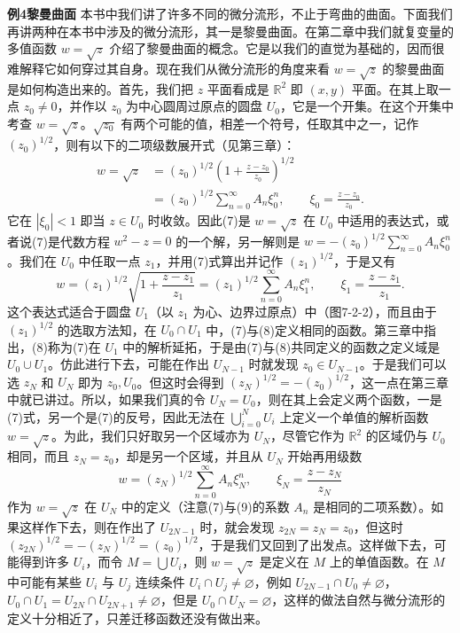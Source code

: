 \noindent\textbf{例4\quad 黎曼曲面}\quad
本书中我们讲了许多不同的微分流形，不止于弯曲的曲面。下面我们再讲两种在本书中涉及的微分流形，其一是黎曼曲面。在第二章中我们就复变量的多值函数 $w=\sqrt z$ 介绍了黎曼曲面的概念。它是以我们的直觉为基础的，因而很难解释它如何穿过其自身。现在我们从微分流形的角度来看 $w=\sqrt z$ 的黎曼曲面是如何构造出来的。首先，我们把 $z$ 平面看成是 $\mathbb R^2$ 即 $(x,y)$ 平面。在其上取一点 $z_0\ne0$，并作以 $z_0$ 为中心圆周过原点的圆盘 $U_0$，它是一个开集。在这个开集中考查 $w=\sqrt z$。$\sqrt{z_0}$ 有两个可能的值，相差一个符号，任取其中之一，记作 $(z_0)^{1/2}$，则有以下的二项级数展开式（见第三章）：
\begin{equation}
 \begin{aligned}
 w=\sqrt z
 &= (z_0)^{1/2}\left(1+\frac{z-z_0}{z_0}\right)^{1/2}\\
 &= (z_0)^{1/2}\sum_{n=0}^{\infty}A_n\xi_0^n,
 \qquad \xi_0=\frac{z-z_0}{z_0}.
 \end{aligned}
 \tag{7}
\end{equation}
它在 $|\xi_0|<1$ 即当 $z\in U_0$ 时收敛。因此(7)是 $w=\sqrt z$ 在 $U_0$ 中适用的表达式，或者说(7)是代数方程 $w^2-z=0$ 的一个解，另一解则是 $w=-(z_0)^{1/2}\sum_{n=0}^\infty A_n\xi_0^n$。我们在 $U_0$ 中任取一点 $z_1$，并用(7)式算出并记作 $(z_1)^{1/2}$，于是又有
\begin{equation}
 w=(z_1)^{1/2}\sqrt{1+\frac{z-z_1}{z_1}}
 =(z_1)^{1/2}\sum_{n=0}^{\infty}A_n\xi_1^n,
 \qquad \xi_1=\frac{z-z_1}{z_1}.
 \tag{8}
\end{equation}
这个表达式适合于圆盘 $U_1$（以 $z_1$ 为心、边界过原点）中（图7-2-2），而且由于 $(z_1)^{1/2}$ 的选取方法知，在 $U_0\cap U_1$ 中，(7)与(8)定义相同的函数。第三章中指出，(8)称为(7)在 $U_1$ 中的解析延拓，于是由(7)与(8)共同定义的函数之定义域是 $U_0\cup U_1$。仿此进行下去，可能在作出 $U_{N-1}$ 时就发现 $z_0\in U_{N-1}$。于是我们可以选 $z_N$ 和 $U_N$ 即为 $z_0,U_0$。但这时会得到 $(z_N)^{1/2}=-(z_0)^{1/2}$，这一点在第三章中就已讲过。所以，如果我们真的令 $U_N=U_0$，则在其上会定义两个函数，一是(7)式，另一个是(7)的反号，因此无法在 $\bigcup_{i=0}^{N}U_i$ 上定义一个单值的解析函数 $w=\sqrt z$。为此，我们只好取另一个区域亦为 $U_N$，尽管它作为 $\mathbb R^2$ 的区域仍与 $U_0$ 相同，而且 $z_N=z_0$，却是另一个区域，并且从 $U_N$ 开始再用级数
\begin{equation}
 w=(z_N)^{1/2}\sum_{n=0}^{\infty}A_n\xi_N^n,
 \qquad \xi_N=\frac{z-z_N}{z_N}
 \tag{9}
\end{equation}
作为 $w=\sqrt z$ 在 $U_N$ 中的定义（注意(7)与(9)的系数 $A_n$ 是相同的二项系数）。如果这样作下去，则在作出了 $U_{2N-1}$ 时，就会发现 $z_{2N}=z_N=z_0$，但这时 $(z_{2N})^{1/2}=-(z_N)^{1/2}=(z_0)^{1/2}$，于是我们又回到了出发点。这样做下去，可能得到许多 $U_i$，而令 $M=\bigcup U_i$，则 $w=\sqrt z$ 是定义在 $M$ 上的单值函数。在 $M$ 中可能有某些 $U_i$ 与 $U_j$ 连续条件 $U_i\cap U_j\ne\varnothing$，例如 $U_{2N-1}\cap U_0\ne\varnothing$，$U_0\cap U_1=U_{2N}\cap U_{2N+1}\ne\varnothing$，但是 $U_0\cap U_N=\varnothing$，这样的做法自然与微分流形的定义十分相近了，只差迁移函数还没有做出来。

